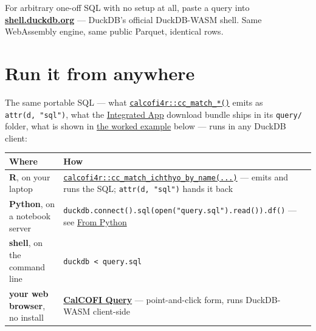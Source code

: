 \documentclass[
  letterpaper,
  DIV=11,
  numbers=noendperiod]{scrreprt}
\newenvironment{Shaded}{\begin{snugshade}}{\end{snugshade}}
\newcommand{\BuiltInTok}[1]{\textcolor[rgb]{0.00,0.23,0.31}{#1}}
\newcommand{\ControlFlowTok}[1]{\textcolor[rgb]{0.00,0.23,0.31}{\textbf{#1}}}
\newcommand{\DataTypeTok}[1]{\textcolor[rgb]{0.68,0.00,0.00}{#1}}
\newcommand{\FunctionTok}[1]{\textcolor[rgb]{0.28,0.35,0.67}{#1}}
\newcommand{\KeywordTok}[1]{\textcolor[rgb]{0.00,0.23,0.31}{\textbf{#1}}}
\newcommand{\NormalTok}[1]{\textcolor[rgb]{0.00,0.23,0.31}{#1}}
\newcommand{\OperatorTok}[1]{\textcolor[rgb]{0.37,0.37,0.37}{#1}}
\newcommand{\SpecialCharTok}[1]{\textcolor[rgb]{0.37,0.37,0.37}{#1}}
\newcommand{\StringTok}[1]{\textcolor[rgb]{0.13,0.47,0.30}{#1}}
\newcommand{\VerbatimStringTok}[1]{\textcolor[rgb]{0.13,0.47,0.30}{#1}}
\begin{document}
\begin{Shaded}
\end{Shaded}

For arbitrary one-off SQL with no setup at all, paste a query into
\href{https://shell.duckdb.org}{\textbf{shell.duckdb.org}} --- DuckDB's
official DuckDB-WASM shell. Same WebAssembly engine, same public
Parquet, identical rows.

\section{Run it from anywhere}\label{run-it-from-anywhere}

The same portable SQL --- what
\href{helpers.qmd}{\texttt{calcofi4r::cc\_match\_*()}} emits as
\texttt{attr(d,\ "sql")}, what the
\href{https://app.calcofi.io/db-viz-hex}{Integrated App} download bundle
ships in its \texttt{query/} folder, what is shown in
\hyperref[sec-worked-example]{the worked example} below --- runs in any
DuckDB client:

\begin{longtable}[]{@{}
  >{\raggedright\arraybackslash}p{}
  >{\raggedright\arraybackslash}p{}@{}}
\toprule\noalign{}
\begin{minipage}[b]{\linewidth}\raggedright
Where
\end{minipage} & \begin{minipage}[b]{\linewidth}\raggedright
How
\end{minipage} \\
\midrule\noalign{}
\endhead
\bottomrule\noalign{}
\endlastfoot
\textbf{R}, on your laptop &
\href{helpers.qmd}{\texttt{calcofi4r::cc\_match\_ichthyo\_by\_name(...)}}
--- emits and runs the SQL; \texttt{attr(d,\ "sql")} hands it back \\
\textbf{Python}, on a notebook server &
\texttt{duckdb.connect().sql(open("query.sql").read()).df()} --- see
\hyperref[from-python]{From Python} \\
\textbf{shell}, on the command line &
\texttt{duckdb\ \textless{}\ query.sql} \\
\textbf{your web browser}, no install &
\textbf{\href{https://calcofi.io/db-query/}{CalCOFI Query}} ---
point-and-click form, runs DuckDB-WASM client-side \\
\end{longtable}
\end{document}
